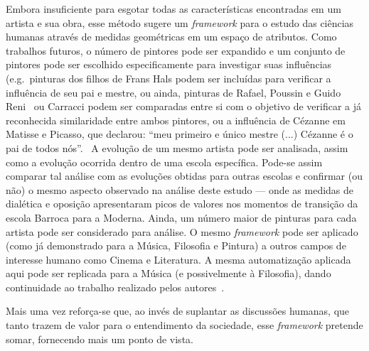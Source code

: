 Embora insuficiente para esgotar todas as características encontradas em um
artista e sua obra, esse método sugere um \textit{framework} para o estudo das
ciências humanas através de medidas geométricas em um espaço de atributos.
Como trabalhos futuros, o número de pintores pode ser expandido e um conjunto de
pintores pode ser escolhido especificamente para investigar suas influências
(e.g.\ pinturas dos filhos de Frans Hals podem ser incluídas para verificar a
influência de seu pai e mestre, ou ainda, pinturas de Rafael, Poussin e Guido
Reni~\cite{gombrich} ou Carracci podem ser comparadas entre si com o objetivo de
verificar a já reconhecida similaridade entre ambos pintores, ou a influência de
Cézanne em Matisse e Picasso, que declarou: ``meu primeiro e único mestre (...)
Cézanne é o pai de todos nós''.~\cite{rishel} A evolução de um mesmo artista
pode ser analisada, assim como a evolução ocorrida dentro de uma escola
específica. Pode-se assim comparar tal análise com as evoluções obtidas para
outras escolas e confirmar (ou não) o mesmo aspecto observado na análise deste
estudo --- onde as medidas de dialética e oposição apresentaram picos de valores
nos momentos de transição da escola Barroca para a Moderna. Ainda, um número maior
de pinturas para cada artista pode ser considerado para análise. O mesmo
\textit{framework} pode ser aplicado (como já demonstrado para a Música,
Filosofia e Pintura) a outros campos de interesse humano como Cinema e
Literatura. A mesma automatização aplicada aqui pode ser replicada para a
Música (e possivelmente à Filosofia), dando continuidade ao trabalho realizado
pelos autores~\cite{vieira}.

Mais uma vez reforça-se que, ao invés de suplantar as discussões humanas, que
tanto trazem de valor para o entendimento da sociedade, esse \textit{framework}
pretende somar, fornecendo mais um ponto de vista.
